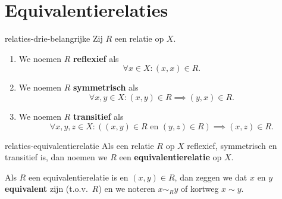\section{Equivalentierelaties}
\begin{definitie}{}{relaties-drie-belangrijke}
    Zij $R$ een relatie op $X$.
    \begin{enumerate}[label = (\alph*)]
        \item We noemen $R$ \textbf{reflexief} als
            \[
                \forall x \in X: (x,x) \in R.
            \]
        \item We noemen $R$ \textbf{symmetrisch} als
            \[
                \forall x,y \in X: (x,y) \in R \implies (y,x) \in R.
            \]
        \item We noemen $R$ \textbf{transitief} als
            \[
                \forall x,y,z \in X: ((x,y) \in R\,\, \text{en}\,\, (y,z) \in R) \implies (x,z) \in R.
            \]
    \end{enumerate}
\end{definitie}
\begin{definitie}{}{relaties-equivalentierelatie}
    Als een relatie $R$ op $X$ reflexief, symmetrisch en transitief is, dan noemen we $R$ een \textbf{equivalentierelatie} op $X$.

    Als $R$ een equivalentierelatie is en $(x,y) \in R$, dan zeggen we dat $x$ en $y$ \textbf{equivalent} zijn (t.o.v.\ $R$) en we noteren $x \sim_R y$ of kortweg $x \sim y$.
\end{definitie}


